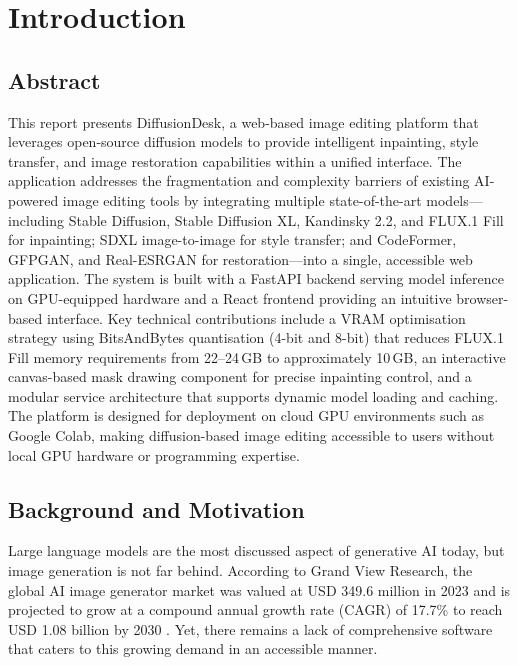 \documentclass[12pt,a4paper]{report}
\begin{document}
\section{Introduction}
\label{sec:introduction}

\subsection{Abstract}

This report presents DiffusionDesk, a web-based image editing platform that leverages open-source diffusion models to provide intelligent inpainting, style transfer, and image restoration capabilities within a unified interface. The application addresses the fragmentation and complexity barriers of existing AI-powered image editing tools by integrating multiple state-of-the-art models---including Stable Diffusion, Stable Diffusion XL, Kandinsky 2.2, and FLUX.1 Fill for inpainting; SDXL image-to-image for style transfer; and CodeFormer, GFPGAN, and Real-ESRGAN for restoration---into a single, accessible web application. The system is built with a FastAPI backend serving model inference on GPU-equipped hardware and a React frontend providing an intuitive browser-based interface. Key technical contributions include a VRAM optimisation strategy using BitsAndBytes quantisation (4-bit and 8-bit) that reduces FLUX.1 Fill memory requirements from 22--24\,GB to approximately 10\,GB, an interactive canvas-based mask drawing component for precise inpainting control, and a modular service architecture that supports dynamic model loading and caching. The platform is designed for deployment on cloud GPU environments such as Google Colab, making diffusion-based image editing accessible to users without local GPU hardware or programming expertise.

\subsection{Background and Motivation}

Large language models are the most discussed aspect of generative AI today, but image generation is not far behind. According to Grand View Research, the global AI image generator market was valued at USD 349.6 million in 2023 and is projected to grow at a compound annual growth rate (CAGR) of 17.7\% to reach USD 1.08 billion by 2030 \citep{grandviewresearch2023}. Yet, there remains a lack of comprehensive software that caters to this growing demand in an accessible manner.
\end{document}
